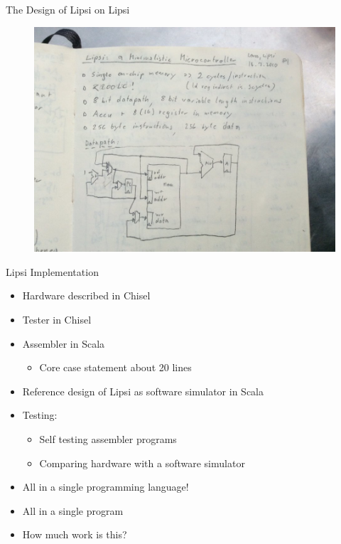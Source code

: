 \begin{frame}[fragile]{The Design of Lipsi on Lipsi}
\begin{figure}
    \centering
    \includegraphics[scale=0.3]{../slides-tutorial/lipsi}
\end{figure}
\end{frame}

\begin{frame}[fragile]{Lipsi Implementation}
\begin{itemize}
\item Hardware described in Chisel
\item Tester in Chisel
\item Assembler in Scala
\begin{itemize}
\item Core case statement about 20 lines
\end{itemize}
\item Reference design of Lipsi as software simulator in Scala
\item Testing:
\begin{itemize}
\item Self testing assembler programs
\item Comparing hardware with a software simulator
\end{itemize}
\item All in a single programming language!
\item All in a single program
\item How much work is this?
\end{itemize}
\end{frame}


